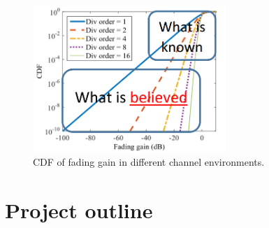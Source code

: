 \begin{figure}[H]
\centering
\includegraphics[width=0.65\textwidth]{figures/fading_gain.png}
\caption{\gls{CDF} of fading gain in different channel environments.}
\label{fading_gain}
\end{figure}


\section{Project outline}





